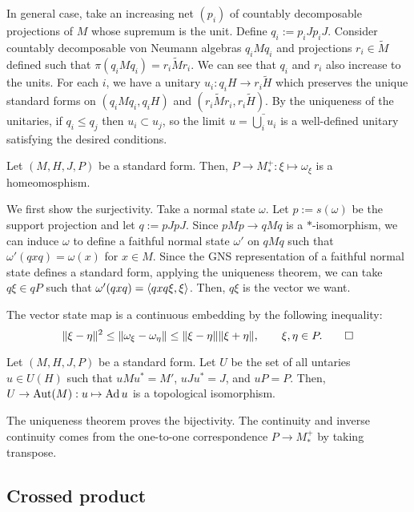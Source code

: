 \documentclass{../../../small}
\begin{document}
\begin{pf}
In general case, take an increasing net $(p_i)$ of countably decomposable projections of $M$ whose supremum is the unit.
Define $q_i:=p_iJp_iJ$.
Consider countably decomposable von Neumann algebras $q_iMq_i$ and projections $r_i\in\tilde M$ defined such that $\pi(q_iMq_i)=r_i\tilde Mr_i$.
We can see that $q_i$ and $r_i$ also increase to the units.
For each $i$, we have a unitary $u_i:q_iH\to r_i\tilde H$ which preserves the unique standard forms on $(q_iMq_i,q_iH)$ and $(r_i\tilde M r_i,r_i\tilde H)$.
By the uniqueness of the unitaries, if $q_i\le q_j$ then $u_i\subset u_j$, so the limit $u=\bar{\bigcup_iu_i}$ is a well-defined unitary satisfying the desired conditions.
\end{pf}

\begin{cor}
Let $(M,H,J,P)$ be a standard form.
Then, $P\to M_*^+:\xi\mapsto\omega_\xi$ is a homeomosphism.
\end{cor}
\begin{pf}
We first show the surjectivity.
Take a normal state $\omega$.
Let $p:=s(\omega)$ be the support projection and let $q:=pJpJ$.
Since $pMp\to qMq$ is a $*$-isomorphism, we can induce $\omega$ to define a faithful normal state $\omega'$ on $qMq$ such that $\omega'(qxq)=\omega(x)$ for $x\in M$.
Since the GNS representation of a faithful normal state defines a standard form, applying the uniqueness theorem, we can take $q\xi\in qP$ such that $\omega'(qxq)=\langle qxq\xi,\xi\rangle$.
Then, $q\xi$ is the vector we want.

The vector state map is a continuous embedding by the following inequality:
\[\|\xi-\eta\|^2\le\|\omega_\xi-\omega_\eta\|\le\|\xi-\eta\|\|\xi+\eta\|,\qquad\xi,\eta\in P.\qedhere\]
\end{pf}

\begin{cor}
Let $(M,H,J,P)$ be a standard form.
Let $U$ be the set of all untaries $u\in U(H)$ such that $uMu^*=M'$, $uJu^*=J$, and $uP=P$.
Then, $U\to\operatorname{Aut}(M):u\mapsto\operatorname{Ad} u$ is a topological isomorphism.
\end{cor}
\begin{pf}
The uniqueness theorem proves the bijectivity.
The continuity and inverse continuity comes from the one-to-one correspondence $P\to M_*^+$ by taking transpose.
\end{pf}



\subsection{Crossed product}
\end{document}
